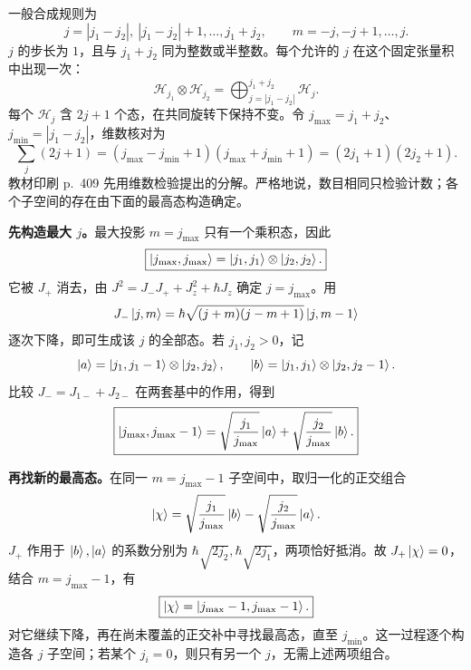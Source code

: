 一般合成规则为
\begin{equation}
  \boxed{j=|j_1-j_2|,\ |j_1-j_2|+1,\ldots,j_1+j_2,\qquad
    m=-j,-j+1,\ldots,j.}
\end{equation}
$j$ 的步长为 $1$，且与 $j_1+j_2$ 同为整数或半整数。每个允许的 $j$ 在这个固定张量积中出现一次：
\begin{equation}
  \boxed{\mathcal H_{j_1}\otimes\mathcal H_{j_2}
    =\bigoplus_{j=|j_1-j_2|}^{j_1+j_2}\mathcal H_j.}
\end{equation}
每个 $\mathcal H_j$ 含 $2j+1$ 个态，在共同旋转下保持不变。令 $j_{\max}=j_1+j_2$、$j_{\min}=|j_1-j_2|$，维数核对为
\begin{equation}
  \sum_j(2j+1)
  =(j_{\max}-j_{\min}+1)(j_{\max}+j_{\min}+1)
  =(2j_1+1)(2j_2+1).
\end{equation}
教材印刷 p.~409 先用维数检验提出的分解。严格地说，数目相同只检验计数；各个子空间的存在由下面的最高态构造确定。

\textbf{先构造最大 $j$。}最大投影 $m=j_{\max}$ 只有一个乘积态，因此
\begin{equation}
  \boxed{\left|j_{\max},j_{\max}\right\rangle
    =\left|j_1,j_1\right\rangle\otimes\left|j_2,j_2\right\rangle.}
\end{equation}
它被 $J_+$ 消去，由 $J^2=J_-J_++J_z^2+\hbar J_z$ 确定 $j=j_{\max}$。用
\begin{equation}
  J_-\left|j,m\right\rangle=\hbar\sqrt{(j+m)(j-m+1)}\left|j,m-1\right\rangle
\end{equation}
逐次下降，即可生成该 $j$ 的全部态。若 $j_1,j_2>0$，记
\begin{equation}
  \left|a\right\rangle=\left|j_1,j_1-1\right\rangle\otimes\left|j_2,j_2\right\rangle,\qquad
  \left|b\right\rangle=\left|j_1,j_1\right\rangle\otimes\left|j_2,j_2-1\right\rangle.
\end{equation}
比较 $J_-=J_{1-}+J_{2-}$ 在两套基中的作用，得到
\begin{equation}
  \boxed{\left|j_{\max},j_{\max}-1\right\rangle
    =\sqrt{\frac{j_1}{j_{\max}}}\left|a\right\rangle
     +\sqrt{\frac{j_2}{j_{\max}}}\left|b\right\rangle.}
\end{equation}

\textbf{再找新的最高态。}在同一 $m=j_{\max}-1$ 子空间中，取归一化的正交组合
\begin{equation}
  \left|\chi\right\rangle=\sqrt{\frac{j_1}{j_{\max}}}\left|b\right\rangle
           -\sqrt{\frac{j_2}{j_{\max}}}\left|a\right\rangle.
\end{equation}
$J_+$ 作用于 $\left|b\right\rangle,\left|a\right\rangle$ 的系数分别为 $\hbar\sqrt{2j_2},\hbar\sqrt{2j_1}$，两项恰好抵消。故 $J_+\left|\chi\right\rangle=0$，结合 $m=j_{\max}-1$，有
\begin{equation}
  \boxed{\left|\chi\right\rangle=\left|j_{\max}-1,j_{\max}-1\right\rangle.}
\end{equation}
对它继续下降，再在尚未覆盖的正交补中寻找最高态，直至 $j_{\min}$。这一过程逐个构造各 $j$ 子空间；若某个 $j_i=0$，则只有另一个 $j$，无需上述两项组合。

